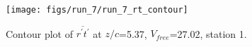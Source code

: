 \begin{figure}[H]
\centering
\texttt{[image: figs/run\_7/run\_7\_rt\_contour]}
\caption{Contour plot of $\overline{r^\prime t^\prime}$ at $z/c$=5.37, $V_{free}$=27.02, station 1.}
\label{fig:run_7_rt_contour}
\end{figure}


